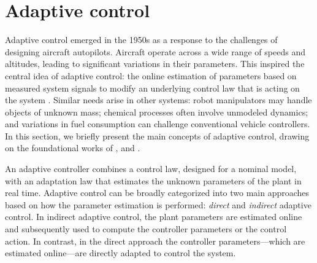 \section{Adaptive control}\label{sec:background-adaptive-control}
Adaptive control emerged in the 1950s as a response to the challenges of designing aircraft autopilots. Aircraft operate across a wide range of speeds and altitudes, leading to significant variations in their parameters. This inspired the central idea of adaptive control: the online estimation of parameters based on measured system signals to modify an underlying control law that is acting on the system \citep{Slotine1991}. Similar needs arise in other systems: robot manipulators may handle objects of unknown mass; chemical processes often involve unmodeled dynamics; and variations in fuel consumption can challenge conventional vehicle controllers. In this section, we briefly present the main concepts of adaptive control, drawing on the foundational works of \citet{Slotine1991}, \citet{Krstic1995} and \citet{Ioannou2012}.

An adaptive controller combines a control law, designed for a nominal model, with an adaptation law that estimates the unknown parameters of the plant in real time. Adaptive control can be broadly categorized into two main approaches based on how the parameter estimation is performed: \emph{direct} and \emph{indirect} adaptive control. In indirect adaptive control, the plant parameters are estimated online and subsequently used to compute the controller parameters or the control action. In contrast, in the direct approach the controller parameters---which are estimated online---are directly adapted to control the system.

